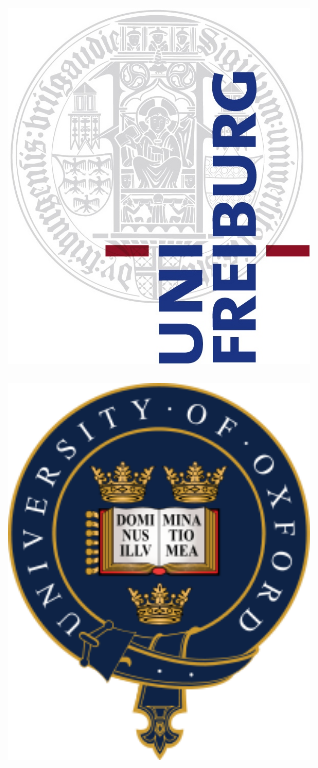 \documentclass[landscape,a0b,final,a4resizeable]{include/a0poster}
\begin{document}
\begin{poster}
\begin{center}
\begin{pcolumn}{0.99}
{\begin{minipage}[c][][b]{\logowidth}
    \includegraphics[width=8cm,trim=0em 0em 0em 0em, clip]{badges/uni-freiburg}
\end{minipage}
%
\hspace{1cm}
% 
\begin{minipage}[c][][b]{\logowidth}
    \includegraphics[width=8cm,trim=0em 0em 0em 0em, clip]{badges/oxford}
\end{minipage}

}
\end{pcolumn}
\end{center}


\end{poster}
\end{document}
